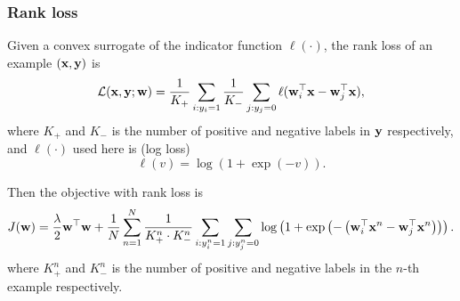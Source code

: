 \subsubsection{Rank loss}
\label{sssec:rank}

Given a convex surrogate of the indicator function $\ell(\cdot)$, 
the rank loss of an example $(\mathbf{x}, \mathbf{y})$ is
\begin{equation*}
\mathcal{L}(\mathbf{x}, \mathbf{y}; \mathbf{w}) = \frac{1}{K_+} \sum_{i: y_i = 1} \frac{1}{K_-} \sum_{j: y_j = 0} \ell(\mathbf{w}_i^\top \mathbf{x} - \mathbf{w}_j^\top \mathbf{x}),
\end{equation*}
where $K_+$ and $K_-$ is the number of positive and negative labels in $\mathbf{y}$ respectively, 
and $\ell(\cdot)$ used here is (log loss)
\begin{equation*}
\ell(v) = \log(1 + \exp(-v)).
\end{equation*}

Then the objective with rank loss is
\begin{equation}
\label{eq:obj_rank}
J(\mathbf{w}) = \frac{\lambda}{2} \mathbf{w}^\top \mathbf{w} + \frac{1}{N} \sum_{n=1}^N \frac{1}{K_+^n \cdot K_-^n} \sum_{i:y_i^n=1} \sum_{j:y_j^n=0} 
        \log \left( 1 + \exp \left( - \left( \mathbf{w}_i^\top \mathbf{x}^n - \mathbf{w}_j^\top \mathbf{x}^n \right) \right) \right).
\end{equation}
where $K_+^n$ and $K_-^n$ is the number of positive and negative labels in the $n$-th example respectively.


